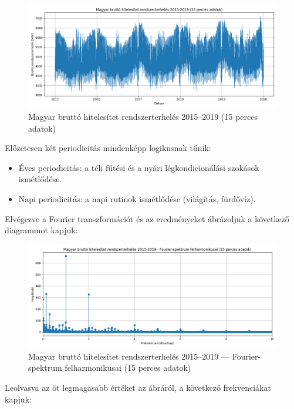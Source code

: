 \begin{figure}[htbp]
    \centering
    \includegraphics[width=1\textwidth, height=0.8\textheight, keepaspectratio]{../figures/electricity_time.png}
    \caption{Magyar bruttó hitelesítet rendszerterhelés 2015--2019 (15 perces adatok)}\label{fig:electricity_time}
\end{figure}

Előzetesen két periodicitás mindenképp logikusnak tűnik:
\begin{itemize}
    \item Éves periodicitás: a téli fűtési és a nyári légkondicionálási szokások ismétlődése.
    \item Napi periodicitás: a napi rutinok ismétlődése (világítás, fürdővíz).
\end{itemize}

Elvégezve a Fourier transzformációt és az eredményeket ábrázoljuk a következő diagrammot kapjuk:

\begin{figure}[htbp]
    \centering
    \includegraphics[width=1\textwidth, height=0.8\textheight, keepaspectratio]{../figures/electricity_fourier.png}
    \caption{Magyar bruttó hitelesítet rendszerterhelés 2015--2019 --- Fourier-spektrum felharmonikusai (15 perces adatok)}\label{fig:electricity_fourier}
\end{figure}

Leolvasva az öt legmagasabb értéket az ábráról, a következő frekvenciákat kapjuk:

